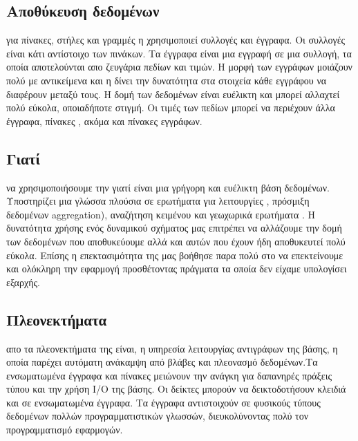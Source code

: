 \subsection*{Αποθύκευση δεδομένων}
 για πίνακες, στήλες και γραμμές η  χρησιμοποιεί συλλογές και έγγραφα. Οι συλλογές είναι κάτι αντίστοιχο των πινάκων. Τα έγγραφα είναι μια εγγραφή σε μια συλλογή, τα οποία αποτελούνται απο ζευγάρια πεδίων και τιμών. Η μορφή των εγγράφων μοιάζουν πολύ με αντικείμενα  και η  δίνει την δυνατότητα στα στοιχεία κάθε εγγράφου να διαφέρουν μεταξύ τους. Η δομή των δεδομένων είναι ευέλικτη και μπορεί αλλαχτεί πολύ εύκολα, οποιαδήποτε στιγμή. Οι τιμές των πεδίων μπορεί να περιέχουν άλλα έγγραφα, πίνακες , ακόμα και πίνακες  εγγράφων.

\subsection*{Γιατί}
 να χρησιμοποιήσουμε την  γιατί είναι μια γρήγορη και ευέλικτη βάση δεδομένων. Υποστηρίζει μια γλώσσα πλούσια σε ερωτήματα για λειτουργίες , πρόσμιξη δεδομένων  aggregation), αναζήτηση κειμένου και γεωχωρικά ερωτήματα . Η δυνατότητα χρήσης ενός δυναμικού σχήματος  μας επιτρέπει να αλλάζουμε την δομή των δεδομένων που αποθυκεύουμε αλλά και αυτών που έχουν ήδη αποθυκευτεί πολύ εύκολα. Επίσης η επεκτασιμότητα της μας βοήθησε παρα πολύ στο να επεκτείνουμε και ολόκληρη την εφαρμογή προσθέτοντας πράγματα τα οποία δεν είχαμε υπολογίσει εξαρχής.
 
\subsection*{Πλεονεκτήματα}
 απο τα πλεονεκτήματα της  είναι, η υπηρεσία λειτουργίας αντιγράφων της βάσης, η οποία παρέχει αυτόματη ανάκαμψη από βλάβες και πλεονασμό δεδομένων.Τα ενσωματωμένα έγγραφα και πίνακες μειώνουν την ανάγκη για δαπανηρές πράξεις τύπου  και την χρήση I/O της βάσης. Οι δείκτες μπορούν να δεικτοδοτήσουν κλειδιά και σε ενσωματωμένα έγγραφα. Τα έγγραφα αντιστοιχούν σε φυσικούς  τύπους δεδομένων πολλών προγραμματιστικών γλωσσών, διευκολύνοντας πολύ τον προγραμματισμό εφαρμογών.

